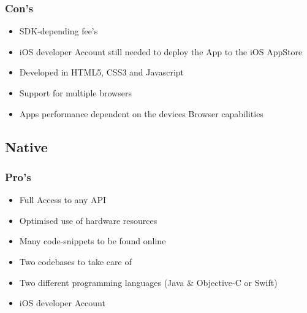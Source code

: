 \documentclass[12pt]{article}
\begin{document}
\subsubsection{Con's }
\begin{itemize}
\item SDK-depending fee's
\item iOS developer Account still needed to deploy the App to the iOS AppStore
\item Developed in HTML5, CSS3 and Javascript
\item Support for multiple browsers
\item Apps performance dependent on the devices Browser capabilities
\end{itemize}

\subsection{Native}

\subsubsection{Pro's}
\begin{itemize}
\item Full Access to any API
\item Optimised use of hardware resources
\item Many code-snippets to be found online
\end{itemize}

\begin{itemize}
\item Two codebases to take care of
\item Two different programming languages (Java \& Objective-C or Swift)
\item iOS developer Account
\end{itemize}
\end{document}
